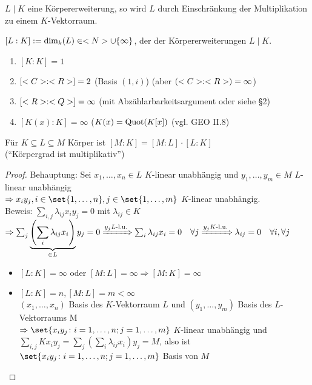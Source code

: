 \begin{remark}
	$L\mid K$ eine Körpererweiterung, so wird $L$ durch Einschränkung der Multiplikation zu einem $K$-Vektorraum.
\end{remark}

\begin{definition}[Körpergrad]
	$[L:K]:= \dim_k(L) \in <N> \cup \{\infty\}$, der  der Körpererweiterungen $L\mid K$.
\end{definition}

\begin{example}
	\begin{enumerate}[label=(\alph*)]
		\item $[K: K] = 1$
		\item $[<C>:<R>] = 2$ (Basis $(1,i)$) (aber $(<C>:<R>) = \infty$)
		\item $[<R>:<Q>] = \infty$ (mit Abzählarbarkeitsargument oder siehe §2) %
		\item $[K(x):K] = \infty$ ($K(x) = \operatorname{Quot}(K[x])$ (vgl. GEO II.8)
	\end{enumerate}
\end{example}

\begin{proposition}
	Für $K \subseteq L \subseteq M$ Körper ist $[M:K] = [M:L]\cdot [L:K]$ \\
	(``Körpergrad ist multiplikativ'')
\end{proposition}

\begin{proof} %
	Behauptung: Sei $x_1, \dots, x_n \in L$ $K$-linear unabhängig und $y_1, \dots, y_m \in M$ $L$-linear unabhängig\\
	$\Rightarrow x_i y_j, i \in \set{1,\dots,n}, j \in \set{1, \dots, m}$ $K$-linear unabhängig.\\
	Beweis: $\sum_{i,j} \lambda_{ij}x_i y_j = 0$ mit $\lambda_{ij} \in K$\\
	$\Rightarrow \sum_{j}\underbrace{\left( \sum_{i} \lambda_{ij}x_i \right)}_{\in L}y_j = 0 
	\xRightarrow{y_j L\text{-l.u.}} \sum_{i} \lambda_{ij} x_i = 0\quad\forall j
	\xRightarrow{y_j K\text{-l.u.}} \lambda_{ij} = 0\quad\forall i, \forall j$
	\begin{itemize}
		\item $[L:K] = \infty$ oder $[M:L] = \infty \Rightarrow [M:K] = \infty$
		\item $[L:K] = n, [M:L] = m < \infty$\\
		$(x_1, \dots, x_n)$ Basis des $K$-Vektorraum $L$ und $(y_1, \dots, y_m)$ Basis des $L$-Vektorraums M\\
		$\Rightarrow \set{x_i y_j \colon i = 1, \dots, n; j = 1, \dots, m}$ $K$-linear unabhängig und \\
		$\sum_{i,j} Kx_i y_j = \sum_{j}\left( \sum_{i} \lambda_{ij}x_i \right)y_j = M$, also ist \\
		$\set{x_i y_j \colon i = 1, \dots ,n; j = 1, \dots, m}$ Basis von $M$ 
	\end{itemize}
\end{proof}

